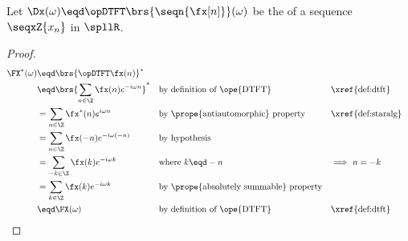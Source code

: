 \begin{proposition}
\label{prop:dtft_conjsym}
Let $\Dx(\omega)\eqd\opDTFT\brs{\seqn{\fx[n]}}(\omega)$ be the  
of a sequence $\seqxZ{x_n}$ in $\spllR$.
\end{proposition}
\begin{proof}
\begin{align*}
  \FX^\ast(\omega)
    &\eqd \brs{\opDTFT\fx(n)}^\ast
  \\&\eqd \brs{\sum_{n\in\Z} \fx(n) e^{-i\omega n}}^\ast && \text{by definition of \ope{DTFT}} && \text{\xref{def:dtft}}
  \\&=         \sum_{n\in\Z} \fx^\ast(n) e^{i\omega n}   && \text{by \prope{antiautomorphic} property} && \text{\xref{def:staralg}}
  \\&=         \sum_{n\in\Z} \fx(-n) e^{-i\omega(-n)}    && \text{by hypothesis}
  \\&=         \sum_{-k\in\Z}\fx(k) e^{-i\omega k}      && \text{where $k\eqd-n$} && \text{$\implies$ $n=-k$}
  \\&=         \sum_{k\in\Z} \fx(k) e^{-i\omega k}      && \text{by \prope{absolutely summable} property}
  \\&\eqd      \FX(\omega)                              && \text{by definition of \ope{DTFT}} && \text{\xref{def:dtft}}
\end{align*}
\end{proof}

